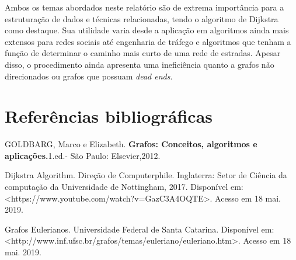 \documentclass[a4paper, 12pt]{article}
\begin{document}
Ambos os temas abordados neste relatório são de extrema importância para a estruturação de dados e técnicas relacionadas, tendo o algoritmo de Dijkstra como destaque. Sua utilidade varia desde a aplicação em algoritmos ainda mais extensos para redes sociais até engenharia de tráfego e algoritmos que tenham a função de determinar o caminho mais curto de uma rede de estradas. Apesar disso, o procedimento ainda apresenta uma ineficiência quanto a grafos não direcionados ou grafos que possuam \textit{dead ends}.

\section{Referências bibliográficas}

\medskip GOLDBARG, Marco e Elizabeth. \textbf{Grafos: Conceitos, algoritmos e aplicações.}1.ed.- São Paulo: Elsevier,2012.

\medskip Dijkstra Algorithm. Direção de Computerphile. Inglaterra: Setor de Ciência da computação da Universidade de Nottingham, 2017. Disponível em: \\<https://www.youtube.com/watch?v=GazC3A4OQTE>. Acesso em 18 mai. 2019.


\medskip Grafos Eulerianos. Universidade Federal de Santa Catarina. Disponível em:\\ <http://www.inf.ufsc.br/grafos/temas/euleriano/euleriano.htm>. Acesso em 18 mai. 2019. 
\end{document}
